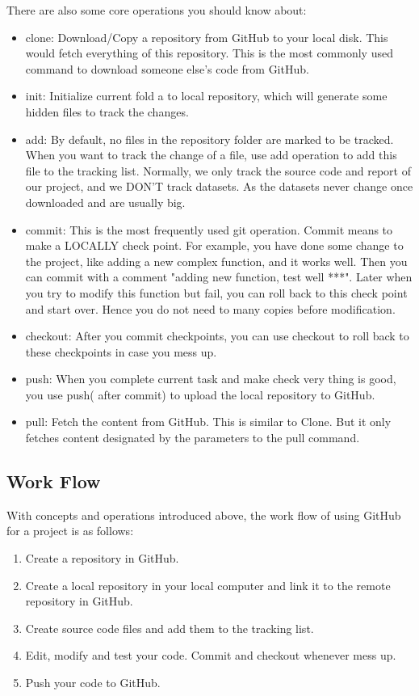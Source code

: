 \documentclass[12pt, fullpage,letterpaper]{article}
\begin{document}
There are also some core operations you should know about:
\begin{itemize}
	\item clone: Download/Copy a repository from GitHub to your local disk. This would fetch everything of this repository. This is the most commonly used command to download someone else's code from GitHub.
	
	\item init: Initialize current fold a to local repository, which will generate some hidden files to track the changes.
	
	\item add: By default, no files in the repository folder are marked to be tracked. When you want to track the change of a file, use add operation to add this file to the tracking list. Normally, we only track the source code and report of our project, and we DON'T track datasets. As the datasets  never change once downloaded and are usually big. 
	
	\item commit: This is the most frequently used git operation. Commit means to make a LOCALLY check point. For example, you have done some change to the project, like adding a new  complex function, and it works well. Then you can commit with a comment "adding new function, test well ***". Later when you try to modify this function but fail, you can roll back to this check point and start over. Hence you do not need to  many copies before modification. 
	
	\item checkout: After you commit checkpoints, you can use checkout to roll back to these checkpoints in case you mess up.
	
	\item push: When you complete current task and make check very thing is good, you use push( after commit) to upload the local repository to GitHub. 
	
	\item pull: Fetch the content from GitHub. This is similar to Clone. But it only fetches content designated by the  parameters to the pull command.    
\end{itemize}

\subsection*{Work Flow}
With concepts and operations introduced above, the work flow of using GitHub for a project is as follows:
\begin{enumerate}
	\item Create a repository in GitHub.
	\item Create a local repository in your local computer and link it to the remote repository in GitHub.
	\item Create source code files and add them to the tracking list.
	\item Edit, modify and test your code. Commit and checkout whenever mess up.
	\item Push your code to GitHub.
\end{enumerate}
\end{document}
